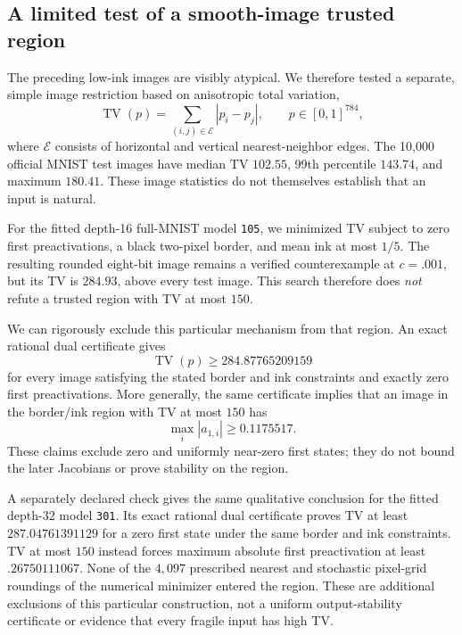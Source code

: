 \subsection{A limited test of a smooth-image trusted region}
\label{sec:smooth-trusted-region}
The preceding low-ink images are visibly atypical.  We therefore tested a separate, simple image restriction based on anisotropic total variation,
\[
 \operatorname{TV}(p)=\sum_{(i,j)\in\mathcal E}|p_i-p_j|,
 \qquad p\in[0,1]^{784},
\]
where $\mathcal E$ consists of horizontal and vertical nearest-neighbor edges.  The 10,000 official MNIST test images have median TV $102.55$, 99th percentile $143.74$, and maximum $180.41$.  These image statistics do not themselves establish that an input is natural.

For the fitted depth-16 full-MNIST model \texttt{105}, we minimized TV subject to zero first preactivations, a black two-pixel border, and mean ink at most $1/5$.  The resulting rounded eight-bit image remains a verified counterexample at $c=.001$, but its TV is $284.93$, above every test image.  This search therefore does \emph{not} refute a trusted region with TV at most $150$.

We can rigorously exclude this particular mechanism from that region.  An exact rational dual certificate gives
\[
 \operatorname{TV}(p)\ge284.87765209159
\]
for every image satisfying the stated border and ink constraints and exactly zero first preactivations.  More generally, the same certificate implies that an image in the border/ink region with TV at most $150$ has
\[
 \max_i |a_{1,i}|\ge0.1175517.
\]
These claims exclude zero and uniformly near-zero first states; they do not bound the later Jacobians or prove stability on the region.

A separately declared check gives the same qualitative conclusion for the fitted depth-$32$ model \texttt{301}.  Its exact rational dual certificate proves TV at least $287.04761391129$ for a zero first state under the same border and ink constraints.  TV at most $150$ instead forces maximum absolute first preactivation at least $.26750111067$.  None of the $4{,}097$ prescribed nearest and stochastic pixel-grid roundings of the numerical minimizer entered the region.  These are additional exclusions of this particular construction, not a uniform output-stability certificate or evidence that every fragile input has high TV.

